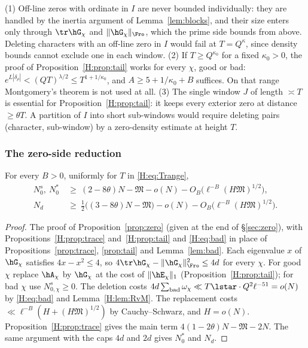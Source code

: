 \begin{remark}\label{H:rem:nodeletion}
(1) Off-line zeros with ordinate in $I$ are never bounded individually: they are handled by the inertia argument of Lemma~\ref{lem:blocks}, and their size enters only through $\tr\hG_\chi$ and $\|\hG_\chi\|_\Fro$, which the prime side bounds from above. Deleting characters with an off-line zero in $I$ would fail at $T=Q^\kappa$, since density bounds cannot exclude one in each window. (2) If $T\ge Q^{\kappa_0}$ for a fixed $\kappa_0>0$, the proof of Proposition~\ref{H:prop:tail} works for every $\chi$, good or bad: $e^{L|\delta_\rho|}<(QT)^{\lambda/2}\le T^{1+1/\kappa_0}$, and $A\ge5+1/\kappa_0+B$ suffices. On that range Montgomery's theorem is not used at all. (3) The single window $J$ of length $\asymp T$ is essential for Proposition~\ref{H:prop:tail}: it keeps every exterior zero at distance $\ge\theta T$. A partition of $I$ into short sub-windows would require deleting pairs (character, sub-window) by a zero-density estimate at height $T$.
\end{remark}

\subsubsection*{The zero-side reduction}
\begin{proposition}\label{H:prop:zero}
For every $B>0$, uniformly for $T$ in \eqref{H:eq:Trange},
\begin{align*}
N^s_0,\ N^*_0&\ \ge\ (2-8\theta)N-\mathfrak M-o(N)-O_B\big(\ell^{-B}(H\mathfrak M)^{1/2}\big),\\
N_d&\ \ge\ \tfrac12\big((3-8\theta)N-\mathfrak M\big)-o(N)-O_B\big(\ell^{-B}(H\mathfrak M)^{1/2}\big).
\end{align*}
\end{proposition}
\begin{proof}
The proof of Proposition~\ref{prop:zero} (given at the end of \S\ref{sec:zero}), with Propositions~\ref{H:prop:trace} and~\ref{H:prop:tail} and \eqref{H:eq:bad} in place of Propositions~\ref{prop:trace}, \ref{prop:tail} and Lemma~\ref{lem:bad}. Each eigenvalue $x$ of $\hG_\chi$ satisfies $4x-x^2\le4$, so $4\tr\hG_\chi-\|\hG_\chi\|_\Fro^2\le4d$ for every $\chi$. For good $\chi$ replace $\hA_\chi$ by $\hG_\chi$ at the cost of $\|\hE_\chi\|_1$ (Proposition~\ref{H:prop:tail}); for bad $\chi$ use $N^s_{0,\chi}\ge0$. The deletion costs $4d\sum_{\rm bad}\omega_\chi\ll T\lstar\cdot Q^2\ell^{-51}=o(N)$ by \eqref{H:eq:bad} and Lemma~\ref{H:lem:RvM}. The replacement costs $\ll\ell^{-B}(H+(H\mathfrak M)^{1/2})$ by Cauchy--Schwarz, and $H=o(N)$. Proposition~\ref{H:prop:trace} gives the main term $4(1-2\theta)N-\mathfrak M-2N$. The same argument with the caps $4d$ and $2d$ gives $N^*_0$ and $N_d$.
\end{proof}


